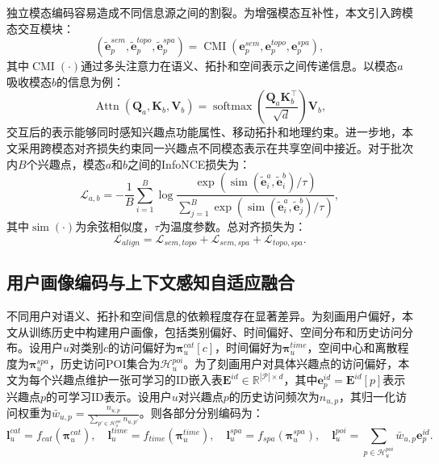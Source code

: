 \documentclass{rjthesis}
\begin{document}
独立模态编码容易造成不同信息源之间的割裂。为增强模态互补性，本文引入跨模态交互模块：
\begin{equation}
(\widetilde{\mathbf e}_p^{sem},\widetilde{\mathbf e}_p^{topo},\widetilde{\mathbf e}_p^{spa})
=\operatorname{CMI}(\mathbf e_p^{sem},\mathbf e_p^{topo},\mathbf e_p^{spa}),
\end{equation}
其中$\operatorname{CMI}(\cdot)$通过多头注意力在语义、拓扑和空间表示之间传递信息。以模态$a$吸收模态$b$的信息为例：
\begin{equation}
\operatorname{Attn}(\mathbf Q_a,\mathbf K_b,\mathbf V_b)
=\operatorname{softmax}\left(\frac{\mathbf Q_a\mathbf K_b^{\top}}{\sqrt d}\right)\mathbf V_b,
\end{equation}
交互后的表示能够同时感知兴趣点功能属性、移动拓扑和地理约束。进一步地，本文采用跨模态对齐损失约束同一兴趣点不同模态表示在共享空间中接近。对于批次内$B$个兴趣点，模态$a$和$b$之间的InfoNCE损失为：
\begin{equation}
\mathcal L_{a,b}=-\frac{1}{B}\sum_{i=1}^{B}\log
\frac{\exp(\operatorname{sim}(\widetilde{\mathbf e}_i^a,\widetilde{\mathbf e}_i^b)/\tau)}
{\sum_{j=1}^{B}\exp(\operatorname{sim}(\widetilde{\mathbf e}_i^a,\widetilde{\mathbf e}_j^b)/\tau)},
\end{equation}
其中$\operatorname{sim}(\cdot)$为余弦相似度，$\tau$为温度参数。总对齐损失为：
\begin{equation}
\mathcal L_{align}=\mathcal L_{sem,topo}+\mathcal L_{sem,spa}+\mathcal L_{topo,spa}.
\end{equation}



\subsection{用户画像编码与上下文感知自适应融合}

不同用户对语义、拓扑和空间信息的依赖程度存在显著差异。为刻画用户偏好，本文从训练历史中构建用户画像，包括类别偏好、时间偏好、空间分布和历史访问分布。设用户$u$对类别$c$的访问偏好为$\boldsymbol\pi_u^{cat}[c]$，时间偏好为$\boldsymbol\pi_u^{time}$，空间中心和离散程度为$\boldsymbol\pi_u^{spa}$，历史访问POI集合为$\mathcal H_u^{poi}$。为了刻画用户对具体兴趣点的访问偏好，本文为每个兴趣点维护一张可学习的ID嵌入表$\mathbf E^{id}\in\mathbb R^{|\mathcal P|\times d}$，其中$\mathbf e_p^{id}=\mathbf E^{id}[p]$表示兴趣点$p$的可学习ID表示。设用户$u$对兴趣点$p$的历史访问频次为$n_{u,p}$，其归一化访问权重为$\bar w_{u,p}=\frac{n_{u,p}}{\sum_{p'\in\mathcal H_u^{poi}}n_{u,p'}}$。则各部分分别编码为：
\begin{equation}
\mathbf l_u^{cat}=f_{cat}(\boldsymbol\pi_u^{cat}),\quad
\mathbf l_u^{time}=f_{time}(\boldsymbol\pi_u^{time}),\quad
\mathbf l_u^{spa}=f_{spa}(\boldsymbol\pi_u^{spa}),\quad
\mathbf l_u^{poi}=\sum_{p\in\mathcal H_u^{poi}}\bar w_{u,p}\mathbf e_p^{id}.
\end{equation}
\end{document}
